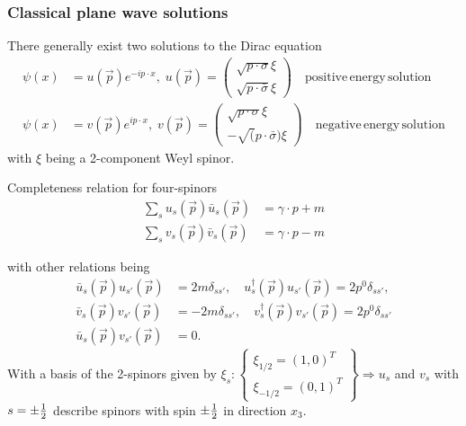 \subsubsection{Classical plane wave solutions}
There generally exist two solutions to the Dirac equation
\begin{align}
	\psi(x) &= u(\vec{p}) e^{- i p \cdot x}, \; u(\vec{p})= \begin{pmatrix}
		\sqrt{p \cdot \sigma} \xi \\
		\sqrt{p \cdot \bar{\sigma}} \xi 
	\end{pmatrix} 
\quad \mathrm{positive \, energy \, solution}\\
\psi(x) &= v(\vec{p}) e^{i p\cdot x}, \; v(\vec{p}) = \begin{pmatrix}
	\sqrt{p\cdot \sigma} \xi \\
	- \sqrt(p\cdot \bar{\sigma}) \xi
\end{pmatrix}
\quad 
\mathrm{negative\, energy\, solution}
\end{align}
with $\xi$ being a 2-component Weyl spinor.

\begin{mybox}{Completeness relation for four-spinors}
	\begin{align}
		\sum_s  u_s(\vec{p}) \bar{u}_s(\vec{p}) &= \gamma \cdot p+m\\
		\sum_s v_s(\vec{p}) \bar{v}_s(\vec{p}) &= \gamma \cdot p -m 
	\end{align}
\end{mybox}
with other relations being
\begin{align*}
	\bar{u}_s(\vec{p}) u_{s'}(\vec{p}) &= 2 m \delta_{s s'}, \quad u^{\dagger}_s(\vec{p})u_{s' }(\vec{p}) = 2 p^0 \delta_{s s'}, \\
	\bar{v}_s(\vec{p})v_{s'}(\vec{p}) &=-2 m \delta_{s s'},\quad v^{\dagger}_s(\vec{p}) v_{s'}(\vec{p}) = 2p^0 \delta_{s s'}\\
	\bar{u}_s(\vec{p}) v_{s'}(\vec{p}) &=0.
\end{align*}
With a basis of the 2-spinors given by $\xi_s: \left\{ \begin{array}{lr}
	\xi_{1/2} =(1,0)^T\\
	\xi_{-1 /2} = (0,1)^T
\end{array}	\right\} \Rightarrow u_s$ and $v_s$ with $s = \pm \frac{1}{2}$ describe spinors with spin $\pm \frac{1}{2}$ in direction $x_3$.


